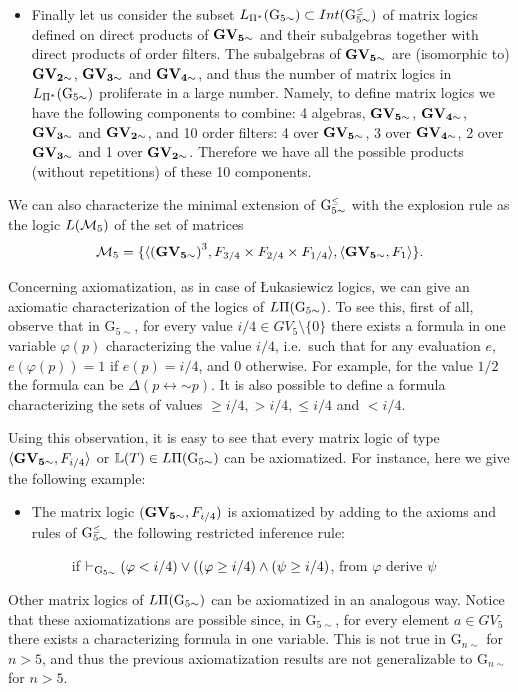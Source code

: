 \documentclass{article}
\theoremstyle{definition}
\newcommand{\ninv}{\mathord{\sim}}
\newcommand{\Gcsimleq}{\mathrm{G}\mystrut^{\text{\tiny $\leq$}}_{5\sim}}
\newcommand\mystrut{\rule{0pt}{7pt}}
\begin{document}
\begin{itemize}
\begin{itemize}
\end{itemize}

\item Finally let us consider the subset $L_{\Pi^*}({\rm G}_{5 \sim})\subset Int(\Gcsimleq)$ of matrix logics defined on direct products of $\bf GV_{5 \sim}$ and their subalgebras together with direct products of order filters.  The subalgebras of $\bf GV_{5 \sim}$ are (isomorphic to)  $\bf GV_{2 \sim}$, $\bf GV_{3 \sim}$ and $\bf GV_{4 \sim}$, and thus the number of matrix logics in $L_{\Pi^*}({\rm G}_{5 \sim})$ proliferate in a large number. Namely, to define matrix logics we have the following components to combine: 4 algebras, $\bf GV_{5 \sim}$, $\bf GV_{4 \sim}$, $\bf GV_{3 \sim}$ and $\bf GV_{2 \sim}$, and 10 order filters:  4 over $\bf GV_{5 \sim}$, 3 over $\bf GV_{4 \sim}$, 2 over $\bf GV_{3 \sim}$ and 1 over $\bf GV_{2 \sim}$. Therefore we have all the possible products (without repetitions) of these 10 components.
 \end{itemize}

  We can also characterize the minimal extension of $\Gcsimleq$ with the explosion rule as the logic $L({\cal M}_5)$ of the set of matrices
 $$ {\cal M}_5 = \{  \langle {\bf (GV_{5 \sim})}^3, F_{3/4} \times  F_{2/4} \times F_{1/4}\rangle, \langle {\bf GV_{5 \sim}}, F_1\rangle \}.$$


Concerning axiomatization, as in case of {\L}ukasiewicz logics, we can give an axiomatic characterization of the logics of $L\Pi({\rm G}_{5 \sim})$.
To see this,
first of all, observe that in G$_{5 \sim}$, for every value $i/4 \in GV_5\setminus \{0\}$ there exists a formula in one variable $\varphi(p)$ characterizing the value $i/4$, i.e.\ such that for any evaluation $e$, $e(\varphi(p)) = 1$ if $e(p) = i/4$, and $0$ otherwise. For example, for the value  $1/2$ the formula can be $\Delta (p \leftrightarrow \ninv p)$. It is also possible to define a formula characterizing the sets of values $\geq i/4, > i/4, \leq i/4$ and $< i/4$.

 Using this observation, it is easy to see that every matrix logic of type  $\langle {\bf GV_{5\sim}}, F_{i/4}\rangle$ or $\mathbb{L}(T) \in L\Pi({\rm G}_{5 \sim})$ can be axiomatized. For instance, here we give the following example:
 \begin{itemize}
 \item The matrix logic $({\bf GV_{5\sim}}, F_{i/4})$ is  axiomatized by adding to the axioms and rules of  $\Gcsimleq$ the following restricted inference rule:
 \begin{description}
\item[] if $\vdash_{{\rm G}_{5\sim}} (\varphi < i/4)\lor ((\varphi \geq i/4) \land (\psi \geq i/4)$,  from $\varphi$ derive $\psi$
\end{description}
 \end{itemize}
Other matrix logics of $L\Pi({\rm G}_{5 \sim})$ can be axiomatized in an analogous way.
 Notice that these axiomatizations are possible since, in G$_{5 \sim}$, for every element $a \in GV_5$ there exists a characterizing formula in one variable. This is not true in G$_{n \sim}$ for $n>5$, and thus the previous axiomatization results are not generalizable to G$_{n \sim}$ for $n > 5$.
\end{document}
